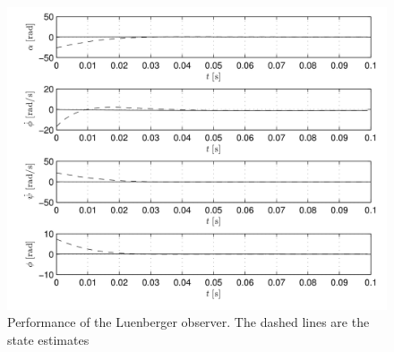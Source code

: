 \documentclass[sublist,a4paper,twoside,11pt]{article}
\begin{document}
\begin{figure}
	\centering
	\includegraphics[width=0.9\linewidth]{figures/LuenbergerObserverPerformance}
	\caption{Performance of the Luenberger observer. The dashed lines are the state estimates}
	\label{fig:luenbergerobserverperformance}
\end{figure}





\end{document}
